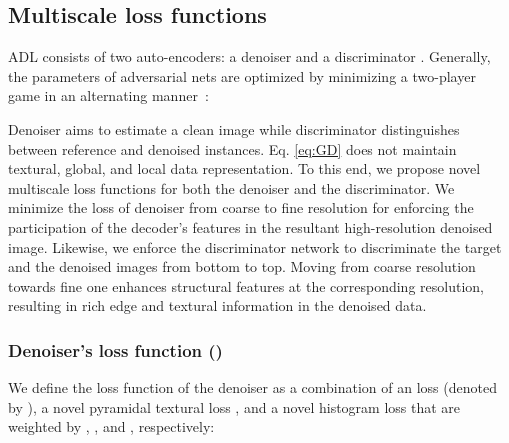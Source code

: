 \documentclass[journal,twoside,web]{ieeecolor}
\begin{document}
\subsection{Multiscale loss functions}\label{sec:loss}
ADL consists of two auto-encoders: a denoiser  and a discriminator . 
Generally, the parameters of adversarial nets are optimized by minimizing a two-player game in an alternating manner~\cite{goodfellow2014generative}:

Denoiser  aims to estimate a clean image while discriminator  distinguishes between reference  and denoised  instances. Eq. \eqref{eq:GD} does not maintain textural, global, and local data representation. 
To this end, we propose novel multiscale loss functions for both the denoiser and the discriminator. 
We minimize the loss of denoiser from coarse to fine resolution for enforcing the participation of the decoder's features in the resultant high-resolution denoised image. Likewise, we enforce the discriminator network to discriminate the target and the denoised images from bottom to top. 
Moving from coarse resolution towards fine one enhances structural features at the corresponding resolution, resulting in rich edge and textural information in the denoised data. 
\subsubsection{Denoiser's loss function ()}
We define the loss function of the denoiser as a combination of an  loss (denoted by ), a novel pyramidal textural loss , and a novel histogram loss  that are weighted by , , and , respectively:
\end{document}
